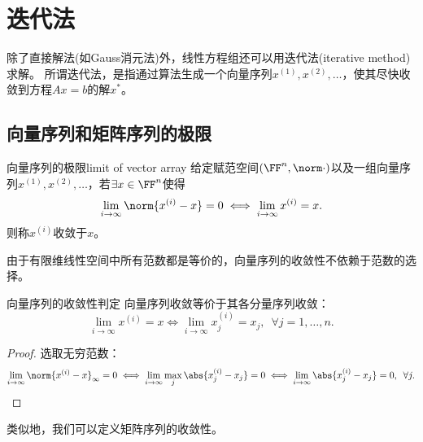 
\section{迭代法}

除了直接解法(如Gauss消元法)外，线性方程组还可以用迭代法(iterative method)求解。
所谓迭代法，是指通过算法生成一个向量序列$x^{(1)},x^{(2)},\ldots$，使其尽快收敛到方程$Ax=b$的解$x^*$。

\subsection{向量序列和矩阵序列的极限}

\begin{definition}
    {向量序列的极限}{limit of vector array}
    给定赋范空间$(\FF^n,\norm\cdot)$以及一组向量序列$x^{(1)},x^{(2)},\ldots$，若$\exists x\in\FF^n$使得
    \begin{equation}
        \lim_{i\to\infty}\norm{x^{(i)}-x}=0\iff\lim_{i\to\infty}x^{(i)}=x.
    \end{equation}
    则称$x^{(i)}$收敛于$x$。
\end{definition}

\begin{remark}
    由于有限维线性空间中所有范数都是等价的，向量序列的收敛性不依赖于范数的选择。
\end{remark}

\begin{theorem}
    {向量序列的收敛性判定}{}
    向量序列收敛等价于其各分量序列收敛：
    \begin{equation}
        \lim_{i\to\infty}x^{(i)}=x\iff\lim_{i\to\infty}x^{(i)}_j=x_j,\enspace \forall j=1,\ldots,n.
    \end{equation}
\end{theorem}

\begin{proof}
    选取无穷范数：
    \[
        \lim_{i\to\infty}\norm{x^{(i)}-x}_\infty=0\iff\lim_{i\to\infty}\max_j\abs{x^{(i)}_j-x_j}=0\iff\lim_{i\to\infty}\abs{x^{(i)}_j-x_j}=0,\enspace\forall j.
        \qedhere
    \]
\end{proof}

\begin{remark}
    类似地，我们可以定义矩阵序列的收敛性。
\end{remark}

